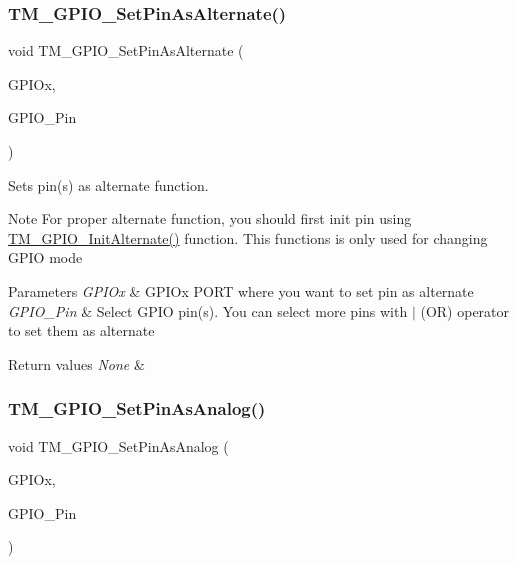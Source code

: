 \subsubsection{\texorpdfstring{T\+M\+\_\+\+G\+P\+I\+O\+\_\+\+Set\+Pin\+As\+Alternate()}{TM\_GPIO\_SetPinAsAlternate()}}
{\footnotesize\ttfamily void T\+M\+\_\+\+G\+P\+I\+O\+\_\+\+Set\+Pin\+As\+Alternate (\begin{DoxyParamCaption}\item[{G\+P\+I\+O\+\_\+\+Type\+Def $\ast$}]{G\+P\+I\+Ox,  }\item[{uint16\+\_\+t}]{G\+P\+I\+O\+\_\+\+Pin }\end{DoxyParamCaption})}



Sets pin(s) as alternate function. 

\begin{DoxyNote}{Note}
For proper alternate function, you should first init pin using \hyperlink{group___t_m___g_p_i_o___functions_gac91349d1bf42b50463ebc2716130eb89}{T\+M\+\_\+\+G\+P\+I\+O\+\_\+\+Init\+Alternate()} function. This functions is only used for changing G\+P\+IO mode 
\end{DoxyNote}

\begin{DoxyParams}{Parameters}
{\em G\+P\+I\+Ox} & G\+P\+I\+Ox P\+O\+RT where you want to set pin as alternate \\
\hline
{\em G\+P\+I\+O\+\_\+\+Pin} & Select G\+P\+IO pin(s). You can select more pins with $\vert$ (OR) operator to set them as alternate \\
\hline
\end{DoxyParams}

\begin{DoxyRetVals}{Return values}
{\em None} & \\
\hline
\end{DoxyRetVals}
\mbox{\label{group___t_m___g_p_i_o___functions_gaeaa3015995a3d1947d63a63240b38433}} 
\subsubsection{\texorpdfstring{T\+M\+\_\+\+G\+P\+I\+O\+\_\+\+Set\+Pin\+As\+Analog()}{TM\_GPIO\_SetPinAsAnalog()}}
{\footnotesize\ttfamily void T\+M\+\_\+\+G\+P\+I\+O\+\_\+\+Set\+Pin\+As\+Analog (\begin{DoxyParamCaption}\item[{G\+P\+I\+O\+\_\+\+Type\+Def $\ast$}]{G\+P\+I\+Ox,  }\item[{uint16\+\_\+t}]{G\+P\+I\+O\+\_\+\+Pin }\end{DoxyParamCaption})}



